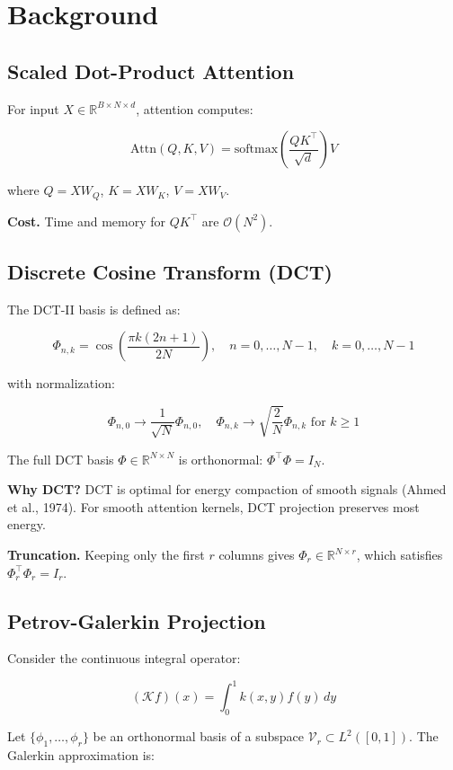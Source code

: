 
\section{Background}

\subsection{Scaled Dot-Product Attention}

For input $X \in \mathbb{R}^{B \times N \times d}$, attention computes:

\[
\text{Attn}(Q, K, V) = \text{softmax}\!\left(\frac{QK^\top}{\sqrt{d}}\right) V
\]

where $Q = XW_Q$, $K = XW_K$, $V = XW_V$.

\textbf{Cost.} Time and memory for $QK^\top$ are $\mathcal{O}(N^2)$.

\subsection{Discrete Cosine Transform (DCT)}

The DCT-II basis is defined as:

\[
\Phi_{n, k} = \cos\!\left(\frac{\pi k (2n + 1)}{2N}\right), \quad
n = 0, \dots, N-1, \quad k = 0, \dots, N-1
\]

with normalization:

\[
\Phi_{n, 0} \to \frac{1}{\sqrt{N}} \Phi_{n, 0}, \quad
\Phi_{n, k} \to \sqrt{\frac{2}{N}} \Phi_{n, k} \text{ for } k \geq 1
\]

The full DCT basis $\Phi \in \mathbb{R}^{N \times N}$ is orthonormal: 
$\Phi^\top \Phi = I_N$.

\textbf{Why DCT?} DCT is optimal for energy compaction of smooth signals 
(Ahmed et al., 1974). For smooth attention kernels, DCT projection preserves 
most energy.

\textbf{Truncation.} Keeping only the first $r$ columns gives 
$\Phi_r \in \mathbb{R}^{N \times r}$, which satisfies 
$\Phi_r^\top \Phi_r = I_r$.

\subsection{Petrov-Galerkin Projection}

Consider the continuous integral operator:

\[
(\mathcal{K} f)(x) = \int_0^1 k(x, y) f(y) \, dy
\]

Let $\{\phi_1, \dots, \phi_r\}$ be an orthonormal basis of a subspace 
$\mathcal{V}_r \subset L^2([0, 1])$. The Galerkin approximation is:

